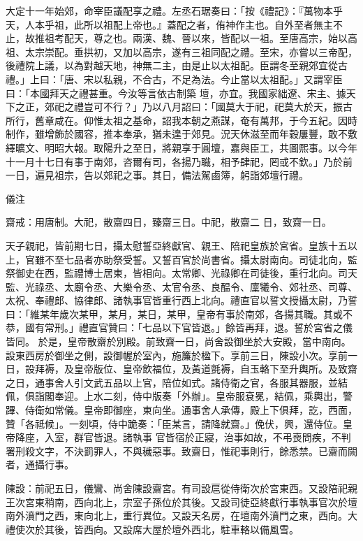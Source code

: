 \begin{pinyinscope}
 大定十一年始郊，命宰臣議配享之禮。左丞石琚奏曰：「按《禮記》：『萬物本乎天，人本乎祖，此所以祖配上帝也。』蓋配之者，侑神作主也。自外至者無主不止，故推祖考配天，尊之也。兩漢、魏、晉以來，皆配以一祖。至唐高宗，始以高祖、太宗崇配。垂拱初，又加以高宗，遂有三祖同配之禮。至宋，亦嘗以三帝配，後禮院上議，以為對越天地，神無二主，由是止以太祖配。臣謂冬至親郊宜從古禮。」上曰：「唐、宋以私親，不合古，不足為法。今止當以太祖配。」又謂宰臣曰：「本國拜天之禮甚重。今汝等言依古制築
 壇，亦宜。我國家絀遼、宋主、據天下之正，郊祀之禮豈可不行？」乃以八月詔曰：「國莫大于祀，祀莫大於天，振古所行，舊章咸在。仰惟太祖之基命，詔我本朝之燕謀，奄有萬邦，于今五紀。因時制作，雖增飾於國容，推本奉承，猶未遑于郊見。況天休滋至而年穀屢豐，敢不敷繹曠文、明昭大報。取陽升之至日，將親享于圓壇，嘉與臣工，共圖熙事。以今年十一月十七日有事于南郊，咨爾有司，各揚乃職，相予肆祀，罔或不欽。」乃於前一日，遍見祖宗，告以郊祀之事。其日，備法駕鹵簿，躬詣郊壇行禮。



 儀注



 齋戒：用唐制。大祀，散齋四日，臻齋三日。中祀，散齋二
 日，致齋一日。



 天子親祀，皆前期七日，攝太慰誓亞終獻官、親王、陪祀皇族於宮省。皇族十五以上，官雖不至七品者亦助祭受誓。又誓百官於尚書省。攝太尉南向。司徒北向，監祭御史在西，監禮博士居東，皆相向。太常卿、光祿卿在司徒後，重行北向。司天監、光祿丞、太廟令丞、大樂令丞、太官令丞、良醖令、廩犧令、郊社丞、司尊、太祝、奉禮郎、協律郎、諸執事官皆重行西上北向。禮直官以誓文授攝太尉，乃誓曰：「維某年歲次某甲，某月，某日，某甲，皇帝有事於南郊，各揚其職。其或不恭，國有常刑。」禮直官贊曰：「七品以下官皆退。」餘皆再拜，退。誓於宮省之儀皆同。
 於是，皇帝散齋於別殿。前致齋一日，尚舍設御坐於大安殿，當中南向。設東西房於御坐之側，設御幄於室內，施簾於楹下。享前三日，陳設小次。享前一日，設拜褥，及皇帝版位、皇帝飲福位，及黃道氈褥，自玉輅下至升輿所。及致齋之日，通事舍人引文武五品以上官，陪位如式。諸侍衛之官，各服其器服，並結佩，俱詣閣奉迎。上水二刻，侍中版奏「外辦」。皇帝服袞冕，結佩，乘輿出，警蹕、侍衛如常儀。皇帝即御座，東向坐。通事舍人承傳，殿上下俱拜，訖，西面，贊「各祗候」。一刻頃，侍中跪奏：「臣某言，請降就齋。」俛伏，興，還侍位。皇帝降座，入室，群官皆退。諸執事
 官皆宿於正寢，治事如故，不弔喪問疾，不判署刑殺文字，不決罰罪人，不與穢惡事。致齋日，惟祀事則行，餘悉禁。已齋而闕者，通攝行事。



 陳設：前祀五日，儀鸞、尚舍陳設齋宮。有司設扈從侍衛次於宮東西。又設陪祀親王次宮東稍南，西向北上，宗室子孫位於其後。又設司徒亞終獻行事執事官次於壇南外濆門之西，東向北上，重行異位。又設天名房，在壇南外濆門之東，西向。大禮使次於其後，皆西向。又設席大屋於壇外西北，駐車輅以備風雪。




\end{pinyinscope}
